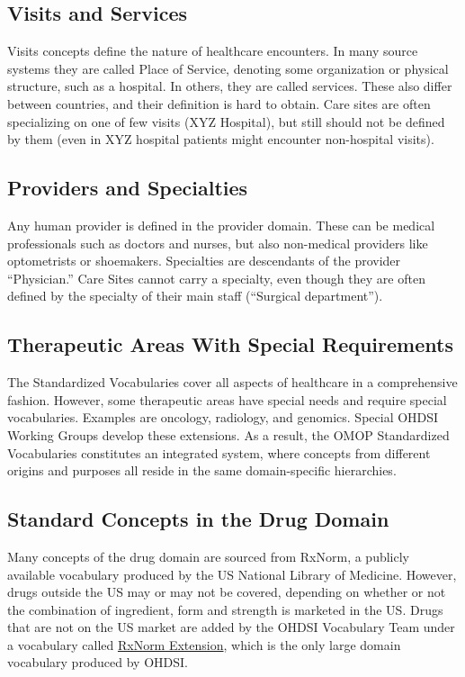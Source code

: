 \documentclass[11pt]{book}
\theoremstyle{definition}
\theoremstyle{definition}
\theoremstyle{definition}
\theoremstyle{remark}
\begin{document}
\subsection{Visits and Services}\label{visits-and-services}

Visits concepts define the nature of healthcare encounters. In many
source systems they are called Place of Service, denoting some
organization or physical structure, such as a hospital. In others, they
are called services. These also differ between countries, and their
definition is hard to obtain. Care sites are often specializing on one
of few visits (XYZ Hospital), but still should not be defined by them
(even in XYZ hospital patients might encounter non-hospital visits).

\subsection{Providers and Specialties}\label{providers-and-specialties}

Any human provider is defined in the provider domain. These can be
medical professionals such as doctors and nurses, but also non-medical
providers like optometrists or shoemakers. Specialties are descendants
of the provider ``Physician.'' Care Sites cannot carry a specialty, even
though they are often defined by the specialty of their main staff
(``Surgical department'').

\subsection{Therapeutic Areas With Special
Requirements}\label{therapeutic-areas-with-special-requirements}

The Standardized Vocabularies cover all aspects of healthcare in a
comprehensive fashion. However, some therapeutic areas have special
needs and require special vocabularies. Examples are oncology,
radiology, and genomics. Special OHDSI Working Groups develop these
extensions. As a result, the OMOP Standardized Vocabularies constitutes
an integrated system, where concepts from different origins and purposes
all reside in the same domain-specific hierarchies.

\subsection{Standard Concepts in the Drug Domain}\label{rxNormExtension}

Many concepts of the drug domain are sourced from RxNorm, a publicly
available vocabulary produced by the US National Library of Medicine.
However, drugs outside the US may or may not be covered, depending on
whether or not the combination of ingredient, form and strength is
marketed in the US. Drugs that are not on the US market are added by the
OHDSI Vocabulary Team under a vocabulary called
\href{https://www.ohdsi.org/web/wiki/doku.php?id=documentation:vocabulary:rxnorm_extension}{RxNorm
Extension}, which is the only large domain vocabulary produced by OHDSI.
\end{document}
